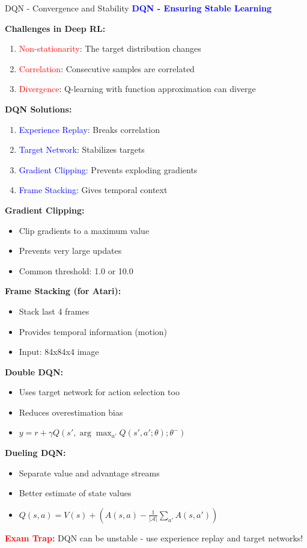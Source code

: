 \documentclass[8pt]{beamer}
\begin{document}
\begin{frame}{DQN - Convergence and Stability}
\fontsize{6.5}{7.5}\selectfont
\textcolor{blue}{\textbf{DQN - Ensuring Stable Learning}}

\textbf{Challenges in Deep RL:}
\begin{enumerate}
\item \textcolor{red}{Non-stationarity}: The target distribution changes
\item \textcolor{red}{Correlation}: Consecutive samples are correlated
\item \textcolor{red}{Divergence}: Q-learning with function approximation can diverge
\end{enumerate}

\textbf{DQN Solutions:}
\begin{enumerate}
\item \textcolor{blue}{Experience Replay}: Breaks correlation
\item \textcolor{blue}{Target Network}: Stabilizes targets
\item \textcolor{blue}{Gradient Clipping}: Prevents exploding gradients
\item \textcolor{blue}{Frame Stacking}: Gives temporal context
\end{enumerate}

\textbf{Gradient Clipping:}
\begin{itemize}
\item Clip gradients to a maximum value
\item Prevents very large updates
\item Common threshold: 1.0 or 10.0
\end{itemize}

\textbf{Frame Stacking (for Atari):}
\begin{itemize}
\item Stack last 4 frames
\item Provides temporal information (motion)
\item Input: 84x84x4 image
\end{itemize}

\textbf{Double DQN:}
\begin{itemize}
\item Uses target network for action selection too
\item Reduces overestimation bias
\item $y = r + \gamma Q(s', \arg\max_{a'} Q(s',a';\theta); \theta^-)$
\end{itemize}

\textbf{Dueling DQN:}
\begin{itemize}
\item Separate value and advantage streams
\item Better estimate of state values
\item $Q(s,a) = V(s) + (A(s,a) - \frac{1}{|\mathcal{A}|}\sum_{a'} A(s,a'))$
\end{itemize}

\textcolor{red}{\textbf{Exam Trap:}} DQN can be unstable - use experience replay and target networks!
\end{frame}
\end{document}
